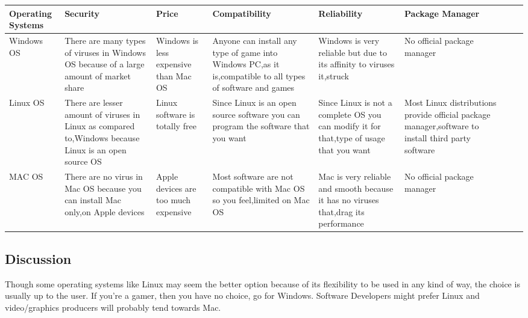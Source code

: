 \documentclass{scrreprt}
\begin{document}
\begin{tabular}{|l|l|l|l|l|l|l|l|}
\hline
Operating Systems & Security                                                                                              & Price                                 & Compatibility                                                                                              & Reliability                                                                             & Package Manager                                                                                   \\ \hline
\parbox{2cm}{Windows OS}        & \parbox{3cm}{There are many types of viruses in Windows OS because of a large amount of market share}               & \parbox{2cm}{Windows is less expensive than Mac OS} & \parbox{3cm}{ Anyone can install any type of game into Windows PC,as it is,compatible to all types of software and games} & \parbox{2cm}{Windows is very reliable but due to its affinity to viruses it,struck }                  & \parbox{2cm}{No official package manager}                                                                         \\ \hline
\parbox{2cm}{Linux OS}         & \parbox{3cm}{There are lesser amount of viruses in Linux as compared to,Windows because Linux is an open source OS} & \parbox{2cm}{ Linux software is totally free}        & \parbox{3cm}{ Since Linux is an open source software you can program the software that you want}  & \parbox{2cm}{Since Linux is not a complete OS you can modify it for that,type of usage that you want} & \parbox{2cm}{Most Linux distributions provide official package manager,software to install third party software} \\ \hline
\parbox{2cm}{MAC OS}           & \parbox{3cm}{There are no virus in Mac OS because you can install Mac only,on Apple devices}      & \parbox{2cm}{Apple devices are too much expensive}  & \parbox{3cm}{Most software are not compatible with Mac OS so you feel,limited on Mac OS }                              & \parbox{2cm}{Mac is very reliable and smooth because it has no viruses that,drag its performance}     & \parbox{2cm}{No official package manager}                                                                       \\ \hline
\end{tabular}



\subsection{Discussion}
Though some operating systems like Linux may seem the better option because of its flexibility to be
used in any kind of way, the choice is usually up to the user. If you’re a gamer, then you have no choice,
go for Windows. Software Developers might prefer Linux and video/graphics producers will probably
tend towards Mac.
\end{document}
